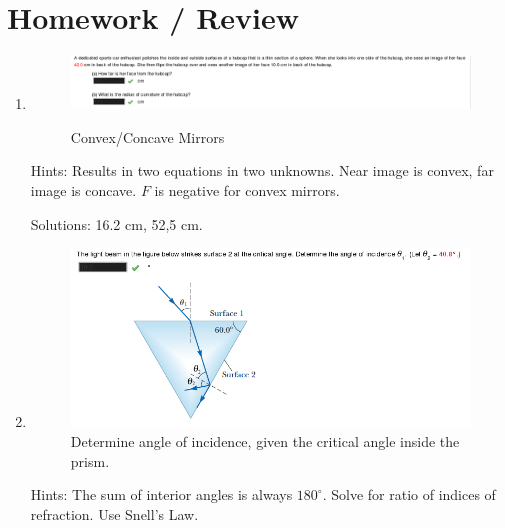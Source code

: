 \documentclass[a4paper,10pt]{report}
\begin{document}
\section{Homework / Review}
\begin{enumerate}

  \item
    \begin{figure}[h!]
    \begin{centering}
    \begin{center}
    \includegraphics[width=\linewidth]{./hw5.png}
    \label{fig:hw_concave_convex}
    \caption{Convex/Concave Mirrors}
    \end{center}
    \par\end{centering}
    \end{figure}
  Hints: Results in two equations in two unknowns. Near image is convex, far image is concave. $F$ is negative for convex mirrors.

  Solutions: 16.2 cm, 52,5 cm.

  \item
    \begin{figure}[h!]
    \begin{centering}
    \begin{center}
    \includegraphics[width=\linewidth]{./prism.png}
    \caption{Determine angle of incidence, given the critical angle inside the prism.}
    \end{center}
    \par\end{centering}
    \end{figure}
  Hints: The sum of interior angles is always $180^{\circ}$. Solve for ratio of indices of refraction. Use Snell's Law.


\end{enumerate}
\end{document}
